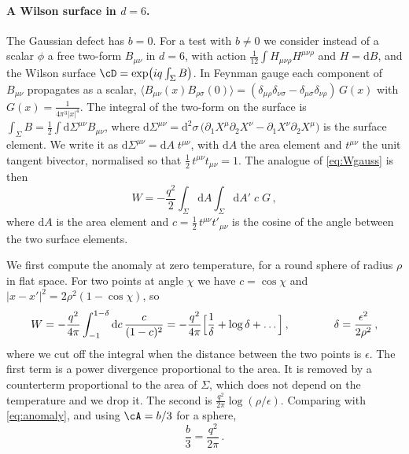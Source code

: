 \documentclass[a4paper,11pt]{article}
\newcommand{\dd}{\mathrm{d}}
\begin{document}
	\paragraph{A Wilson surface in $d=6$.}
	The Gaussian defect has $b=0$. For a test with $b\neq0$ we consider instead of a scalar $\phi$ a free two-form $B_{\mu\nu}$ in $d=6$, with action $\tfrac1{12}\int H_{\mu\nu\rho}H^{\mu\nu\rho}$ and $H=\dd B$, and the Wilson surface $\cD=\exp\bigl(iq\int_\Sigma B\bigr)$. In Feynman gauge each component of $B_{\mu\nu}$ propagates as a scalar, $\langle B_{\mu\nu}(x)B_{\rho\sigma}(0)\rangle=(\delta_{\mu\rho}\delta_{\nu\sigma}-\delta_{\mu\sigma}\delta_{\nu\rho})\,G(x)$ with $G(x)=\tfrac{1}{4\pi^3|x|^4}$. The integral of the two-form on the surface is $\int_\Sigma B=\tfrac12\int\dd\Sigma^{\mu\nu}B_{\mu\nu}$, where $\dd\Sigma^{\mu\nu}=\dd^2\sigma\,\bigl(\partial_1X^\mu\partial_2X^\nu-\partial_1X^\nu\partial_2X^\mu\bigr)$ is the surface element. We write it as $\dd\Sigma^{\mu\nu}=\dd A\;t^{\mu\nu}$, with $\dd A$ the area element and $t^{\mu\nu}$ the unit tangent bivector, normalised so that $\tfrac12\,t^{\mu\nu}t_{\mu\nu}=1$. The analogue of \eqref{eq:Wgauss} is then
	\begin{equation}\label{eq:Wwilson}
		W=-\frac{q^2}{2}\int_\Sigma\!\dd A\int_\Sigma\!\dd A'\;c\;G\, ,
	\end{equation}
	where $\dd A$ is the area element and $c=\tfrac12\,t^{\mu\nu}t'_{\mu\nu}$ is the cosine of the angle between the two surface elements.
	
	We first compute the anomaly at zero temperature, for a round sphere of radius $\rho$ in flat space. For two points at angle $\chi$ we have $c=\cos\chi$ and $|x-x'|^2=2\rho^2(1-\cos\chi)$, so
	\begin{equation}
		W=-\frac{q^2}{4\pi}\int_{-1}^{1-\delta}\dd c\,\frac{c}{(1-c)^2}=-\frac{q^2}{4\pi}\Bigl[\frac1\delta+\log\delta+\dots\Bigr]\, ,\qquad\qquad \delta=\frac{\epsilon^2}{2\rho^2}\, ,
	\end{equation}
	where we cut off the integral when the distance between the two points is $\epsilon$. The first term is a power divergence proportional to the area. It is removed by a counterterm proportional to the area of $\Sigma$, which does not depend on the temperature and we drop it. The second is $\tfrac{q^2}{2\pi}\log(\rho/\epsilon)$. Comparing with \eqref{eq:anomaly}, and using $\cA=b/3$ for a sphere,
	\begin{equation}
		\frac b3=\frac{q^2}{2\pi}\, .
	\end{equation}
	
\end{document}
